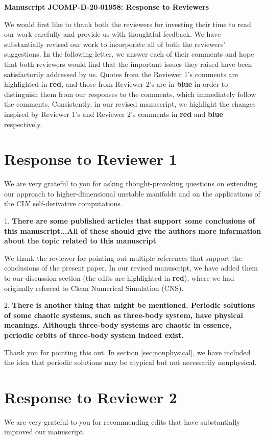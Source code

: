 \documentclass[11pt]{article}
\title{}
\author{}
\date{30th October 2020}
\newcommand{\reviewerOne}[1]{{\color{burgundy}\textbf{#1}}}
\newcommand{\reviewerTwo}[1]{{\color{azure}\textbf{#1}}}
\begin{document}
\begin{center}
		\Large{\textbf{Manuscript JCOMP-D-20-01958: Response to Reviewers}}
\end{center}
\medskip
We would first like to thank both the reviewers for investing their time to read our work carefully and provide us with thoughtful feedback. We have substantially revised our work to incorporate all of both the reviewers' suggestions. In the following letter, we answer each of their comments and hope that both reviewers would find that the 
important issues they raised have been satisfactorily addressed by us.
Quotes from the Reviewer 1's comments are highlighted in \reviewerOne{red}, and those from Reviewer 2's are in \reviewerTwo{blue} in order to distinguish them from our responses to the comments, which immediately follow the comments. Consistently, in our revised manuscript, we highlight the changes inspired by Reviewer 1's and Reviewer 2's comments in \reviewerOne{red} and \reviewerTwo{blue} respectively.
\section{Response to Reviewer 1}
We are very grateful to you for asking thought-provoking
questions on extending our approach to higher-dimensional unstable manifolds 
and on the applications of the CLV self-derivative computations.

1. \reviewerOne{There are some published articles that support some conclusions of this manuscript...All of these should give the authors more information about the topic related to this manuscript}

We thank the reviewer for pointing out multiple references that support the conclusions of the present paper. In our revised manuscript, we have added them to our discussion section (the edits are highlighted in \reviewerOne{red}), where we had originally referred to Clean Numerical Simulation (CNS).


2. \reviewerOne{There is another thing that might be mentioned.  Periodic solutions of some chaotic systems, such as three-body system, have physical meanings.  Although three-body systems are chaotic in essence, periodic orbits of three-body system indeed exist.}

Thank you for pointing this out. In section \ref{sec:nonphysical}, we have included the idea that periodic solutions may be atypical but not necessarily nonphysical.

\section*{Response to Reviewer 2}
We are very grateful to you for recommending edits that have substantially improved our manuscript.
\end{document}
